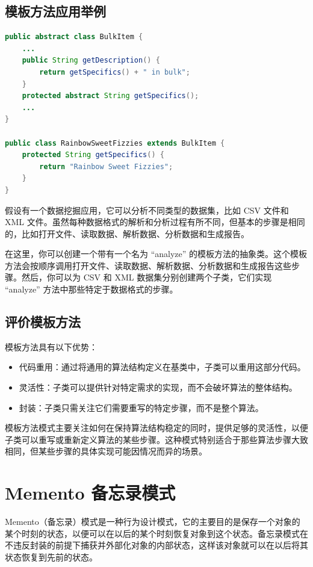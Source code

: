 \subsection{模板方法应用举例}
\begin{lstlisting}[language=Java, caption=Template Method Design Pattern Example, label=lst:template_method_pattern]
public abstract class BulkItem {
	...
	public String getDescription() {
		return getSpecifics() + " in bulk";
	}
	protected abstract String getSpecifics();
	...
}

public class RainbowSweetFizzies extends BulkItem {
	protected String getSpecifics() {
		return "Rainbow Sweet Fizzies";
	}
}
\end{lstlisting}

假设有一个数据挖掘应用，它可以分析不同类型的数据集，比如 CSV 文件和 XML 文件。虽然每种数据格式的解析和分析过程有所不同，但基本的步骤是相同的，比如打开文件、读取数据、解析数据、分析数据和生成报告。

在这里，你可以创建一个带有一个名为 “analyze” 的模板方法的抽象类。这个模板方法会按顺序调用打开文件、读取数据、解析数据、分析数据和生成报告这些步骤。然后，你可以为 CSV 和 XML 数据集分别创建两个子类，它们实现 “analyze” 方法中那些特定于数据格式的步骤。

\subsection{评价模板方法}
模板方法具有以下优势：
\begin{itemize}
	\item 代码重用：通过将通用的算法结构定义在基类中，子类可以重用这部分代码。
	\item 灵活性：子类可以提供针对特定需求的实现，而不会破坏算法的整体结构。
	\item 封装：子类只需关注它们需要重写的特定步骤，而不是整个算法。
\end{itemize}

模板方法模式主要关注如何在保持算法结构稳定的同时，提供足够的灵活性，以便子类可以重写或重新定义算法的某些步骤。这种模式特别适合于那些算法步骤大致相同，但某些步骤的具体实现可能因情况而异的场景。

\section{Memento 备忘录模式}

Memento（备忘录）模式是一种行为设计模式，它的主要目的是保存一个对象的某个时刻的状态，以便可以在以后的某个时刻恢复对象到这个状态。备忘录模式在不违反封装的前提下捕获并外部化对象的内部状态，这样该对象就可以在以后将其状态恢复到先前的状态。

